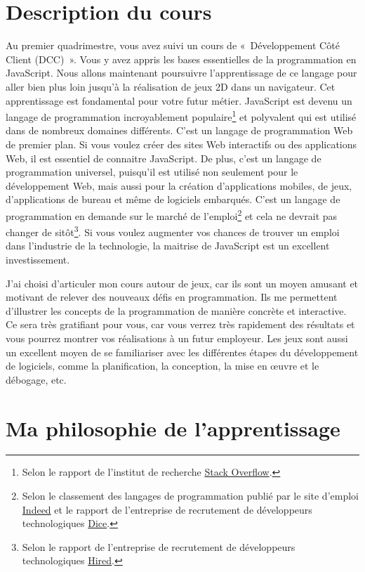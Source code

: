 \section{Description du cours}

Au premier quadrimestre, vous avez suivi un cours de «~Développement Côté Client (DCC)~». Vous y avez appris les bases essentielles de la programmation en JavaScript. Nous allons maintenant poursuivre l'apprentissage de ce langage pour aller bien plus loin jusqu'à la réalisation de jeux 2D dans un navigateur. Cet apprentissage est fondamental pour votre futur métier. JavaScript est devenu un langage de programmation incroyablement populaire\footnote{Selon le rapport de l'institut de recherche \href{https://insights.stackoverflow.com/survey}{Stack Overflow}.} et polyvalent qui est utilisé dans de nombreux domaines différents. C'est un langage de programmation Web de premier plan. Si vous voulez créer des sites Web interactifs ou des applications Web, il est essentiel de connaitre JavaScript. De plus, c'est un langage de programmation universel, puisqu'il est utilisé non seulement pour le développement Web, mais aussi pour la création d'applications mobiles, de jeux, d'applications de bureau et même de logiciels embarqués. C'est un langage de programmation en demande sur le marché de l'emploi\footnote{Selon le classement des langages de programmation publié par le site d'emploi \href{https://www.indeed.com/jobtrends/javascript.html}{Indeed} et le rapport de l'entreprise de recrutement de développeurs technologiques \href{https://www.dice.com}{Dice}.} et cela ne devrait pas changer de sitôt\footnote{Selon le rapport de l'entreprise de recrutement de développeurs technologiques \href{https://hired.com/}{Hired}.}. Si vous voulez augmenter vos chances de trouver un emploi dans l'industrie de la technologie, la maitrise de JavaScript est un excellent investissement.

J'ai choisi d'articuler mon cours autour de jeux, car ils sont un moyen amusant et motivant de relever des nouveaux défis en programmation. Ils me permettent d'illustrer les concepts de la programmation de manière concrète et interactive. Ce sera très gratifiant pour vous, car vous verrez très rapidement des résultats et vous pourrez montrer vos réalisations à un futur employeur. Les jeux sont aussi un excellent moyen de se familiariser avec les différentes étapes du développement de logiciels, comme la planification, la conception, la mise en œuvre et le débogage, etc.

\clearpage
\section{Ma philosophie de l’apprentissage}

